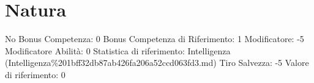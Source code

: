 \section{Natura}\label{natura}

\begin{description}
\tightlist
\item[Tags: ABI]
No Bonus Competenza: 0 Bonus Competenza di Riferimento: 1 Modificatore:
-5 Modificatore Abilità: 0 Statistica di riferimento: Intelligenza
(Intelligenza\%201bff32db87ab426fa206a52ccd063fd3.md) Tiro Salvezza: -5
Valore di riferimento: 0
\end{description}
